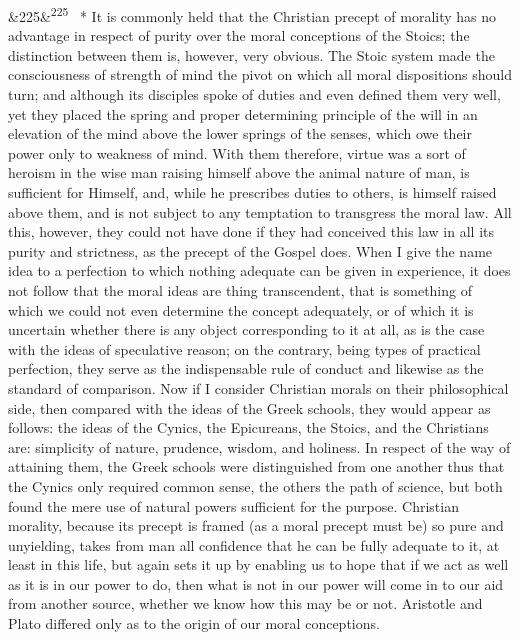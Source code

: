 \documentclass[12pt]{article}
\newcommand{\para}[1][]{\par\noindent\ifx&#1&\else\textsuperscript{\footnotesize #1}~\fi}
\begin{document}
\para[225] * It is commonly held that the Christian precept of morality has no advantage in respect of purity over the moral conceptions of the Stoics; the distinction between them is, however, very obvious. The Stoic system made the consciousness of strength of mind the pivot on which all moral dispositions should turn; and although its disciples spoke of duties and even defined them very well, yet they placed the spring and proper determining principle of the will in an elevation of the mind above the lower springs of the senses, which owe their power only to weakness of mind. With them therefore, virtue was a sort of heroism in the wise man raising himself above the animal nature of man, is sufficient for Himself, and, while he prescribes duties to others, is himself raised above them, and is not subject to any temptation to transgress the moral law. All this, however, they could not have done if they had conceived this law in all its purity and strictness, as the precept of the Gospel does. When I give the name idea to a perfection to which nothing adequate can be given in experience, it does not follow that the moral ideas are thing transcendent, that is something of which we could not even determine the concept adequately, or of which it is uncertain whether there is any object corresponding to it at all, as is the case with the ideas of speculative reason; on the contrary, being types of practical perfection, they serve as the indispensable rule of conduct and likewise as the standard of comparison. Now if I consider Christian morals on their philosophical side, then compared with the ideas of the Greek schools, they would appear as follows: the ideas of the Cynics, the Epicureans, the Stoics, and the Christians are: simplicity of nature, prudence, wisdom, and holiness. In respect of the way of attaining them, the Greek schools were distinguished from one another thus that the Cynics only required common sense, the others the path of science, but both found the mere use of natural powers sufficient for the purpose. Christian morality, because its precept is framed (as a moral precept must be) so pure and unyielding, takes from man all confidence that he can be fully adequate to it, at least in this life, but again sets it up by enabling us to hope that if we act as well as it is in our power to do, then what is not in our power will come in to our aid from another source, whether we know how this may be or not. Aristotle and Plato differed only as to the origin of our moral conceptions.
\end{document}

